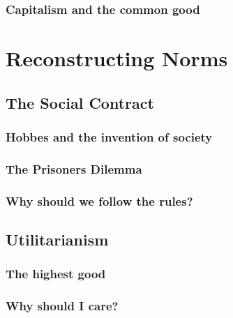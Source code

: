 \documentclass[justified]{tufte-book}
\begin{document}
\hypertarget{capitalism-and-the-common-good}{%
\section{Capitalism and the common good}\label{capitalism-and-the-common-good}}

\hypertarget{part-reconstructing-norms}{%
\part*{Reconstructing Norms}\label{part-reconstructing-norms}}

\hypertarget{the-social-contract}{%
\chapter{The Social Contract}\label{the-social-contract}}

\hypertarget{hobbes-and-the-invention-of-society}{%
\section{Hobbes and the invention of society}\label{hobbes-and-the-invention-of-society}}

\hypertarget{the-prisoners-dilemma}{%
\section{The Prisoners Dilemma}\label{the-prisoners-dilemma}}

\hypertarget{why-should-we-follow-the-rules}{%
\section{Why should we follow the rules?}\label{why-should-we-follow-the-rules}}

\hypertarget{utilitarianism}{%
\chapter{Utilitarianism}\label{utilitarianism}}

\hypertarget{the-highest-good}{%
\section{The highest good}\label{the-highest-good}}

\hypertarget{why-should-i-care}{%
\section{Why should I care?}\label{why-should-i-care}}
\end{document}
